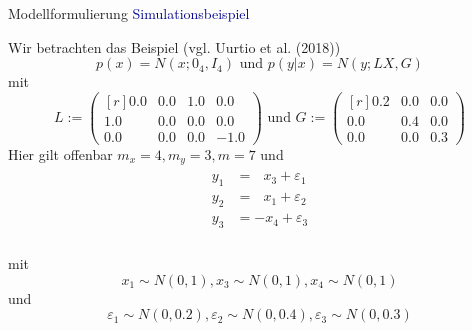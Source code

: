 \documentclass[
  8pt,
  ignorenonframetext,
]{beamer}
\begin{document}
\begin{frame}{Modellformulierung}
\protect\hypertarget{modellformulierung-9}{}
\textcolor{darkblue}{Simulationsbeispiel}

\footnotesize

Wir betrachten das Beispiel (vgl. Uurtio et al. (2018)) \begin{equation}
p(x) = N(x;0_4,I_4) \mbox{ und } p(y|x) = N(y; LX, G)
\end{equation} mit \begin{equation}
L := \begin{pmatrix*}[r] 0.0 & 0.0 & 1.0 & 0.0 \\ 1.0 & 0.0 & 0.0 & 0.0 \\ 0.0 & 0.0 & 0.0 & -1.0 \end{pmatrix*}
\mbox{ und }
G := \begin{pmatrix*}[r] 0.2 & 0.0 & 0.0 \\ 0.0 & 0.4 & 0.0 \\ 0.0 & 0.0 & 0.3 \end{pmatrix*}
\end{equation} Hier gilt offenbar \(m_x = 4, m_y = 3, m = 7\) und
\begin{align}
\begin{split}
y_1 & = \,\,\,\, x_3 + \varepsilon_1 \\
y_2 & = \,\,\,\, x_1 + \varepsilon_2 \\
y_3 & =        - x_4 + \varepsilon_3 \\
\end{split}
\end{align}

mit \begin{equation}
x_1 \sim N(0,1), x_3 \sim N(0,1), x_4 \sim N(0,1)
\end{equation} und \begin{equation}
\varepsilon_1 \sim N(0,0.2), \varepsilon_2 \sim N(0,0.4), \varepsilon_3 \sim N(0,0.3)
\end{equation}
\end{frame}
\end{document}
